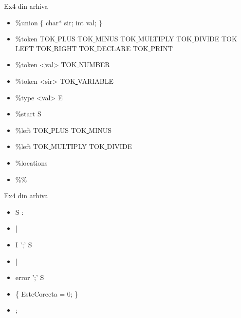 \documentclass[pdf]{beamer}
\begin{document}
\begin{frame}{Ex4 din arhiva}
\begin{itemize}
\item 
\%union \{ char* sir; int val; \}
\item \vspace{4mm}
\%token TOK\underline{ }PLUS TOK\underline{ }MINUS TOK\underline{ }MULTIPLY TOK\underline{ }DIVIDE TOK\underline{ }LEFT TOK\underline{ }RIGHT TOK\underline{ }DECLARE TOK\underline{ }PRINT
\item
\%token <val> TOK\underline{ }NUMBER
\item
\%token <sir> TOK\underline{ }VARIABLE
\item \vspace{5mm}
\%type <val> E
\item \vspace{4mm}
\%start S
\item \vspace{4mm}
\%left TOK\underline{ }PLUS TOK\underline{ }MINUS
\item
\%left TOK\underline{ }MULTIPLY TOK\underline{ }DIVIDE
\item \vspace{4mm}
\%locations
\item \vspace{4mm}
\%\%

\end{itemize}
\end{frame}



\begin{frame}{Ex4 din arhiva}
\begin{itemize}
\item 
S : 
\item \hspace{4mm} 
    |
\item \hspace{4mm} 
    I ';' S
\item \hspace{4mm} 
    | 
\item \hspace{4mm} 
    error ';' S
\item \hspace{6mm} 
       \{ EsteCorecta = 0; \}
\item \hspace{4mm} 
    ;
\end{itemize}
\end{frame}
\end{document}

